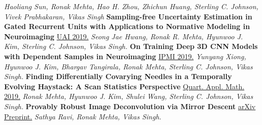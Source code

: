 \documentclass[]{article}
\begin{document}
\textit{Haoliang Sun, Ronak Mehta, Hao H. Zhou, Zhichun Huang, Sterling C. Johnson, Vivek Prabhakaran, Vikas Singh}
\newline\newline
{\bf Sampling-free Uncertainty Estimation in Gated Recurrent Units with Applications to Normative Modeling in Neuroimaging }
\newline
\href{http://auai.org/uai2019/proceedings/papers/296.pdf}{UAI 2019.}
\textit{Seong Jae Hwang, Ronak R. Mehta, Hyunwoo J. Kim, Sterling C. Johnson, Vikas Singh.}
\newline\newline
{\bf On Training Deep 3D CNN Models with Dependent Samples in Neuroimaging}
\newline
\href{https://link.springer.com/chapter/10.1007/978-3-030-20351-1_8}{IPMI 2019.}
\textit{Yunyang Xiong, Hyunwoo J. Kim, Bhargav Tangirala, Ronak Mehta, Sterling C. Johnson, Vikas Singh.}
\newline\newline
{\bf   Finding Differentially Covarying Needles in a Temporally Evolving Haystack: A Scan Statistics Perspective }
\newline
\href{https://www.ams.org/journals/qam/2019-77-02/S0033-569X-2018-01522-9/}{Quart. Appl. Math. 2019.}
\textit{Ronak Mehta, Hyunwoo J. Kim, Shulei Wang, Sterling C. Johnson, Vikas Singh.}
\newline\newline
{\bf Provably Robust Image Deconvolution via Mirror Descent}
\newline
\href{https://arxiv.org/abs/1803.08137}{arXiv Preprint.}
\textit{Sathya Ravi, Ronak Mehta, Vikas Singh.}
\end{document}
